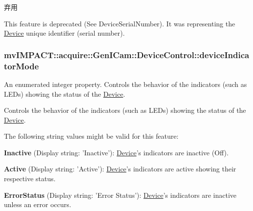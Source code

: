 \begin{DoxyRefDesc}{弃用}
\item[\hyperlink{deprecated__deprecated000037}{弃用}]This feature is deprecated (See Device\+Serial\+Number). It was representing the \hyperlink{classmv_i_m_p_a_c_t_1_1acquire_1_1_device}{Device} unique identifier (serial number). \end{DoxyRefDesc}
\hypertarget{classmv_i_m_p_a_c_t_1_1acquire_1_1_gen_i_cam_1_1_device_control_a62fc0ade07d7b47422b41314eba5d064}{
\subsubsection[{device\+Indicator\+Mode}]{ mv\+I\+M\+P\+A\+C\+T\+::acquire\+::\+Gen\+I\+Cam\+::\+Device\+Control\+::device\+Indicator\+Mode}}\label{classmv_i_m_p_a_c_t_1_1acquire_1_1_gen_i_cam_1_1_device_control_a62fc0ade07d7b47422b41314eba5d064}


An enumerated integer property. Controls the behavior of the indicators (such as L\+E\+Ds) showing the status of the \hyperlink{classmv_i_m_p_a_c_t_1_1acquire_1_1_device}{Device}. 

Controls the behavior of the indicators (such as L\+E\+Ds) showing the status of the \hyperlink{classmv_i_m_p_a_c_t_1_1acquire_1_1_device}{Device}.

The following string values might be valid for this feature\+:
\begin{DoxyItemize}
\item {\bfseries Inactive} (Display string\+: 'Inactive')\+: \hyperlink{classmv_i_m_p_a_c_t_1_1acquire_1_1_device}{Device}'s indicators are inactive (Off).
\item {\bfseries Active} (Display string\+: 'Active')\+: \hyperlink{classmv_i_m_p_a_c_t_1_1acquire_1_1_device}{Device}'s indicators are active showing their respective status.
\item {\bfseries Error\+Status} (Display string\+: 'Error Status')\+: \hyperlink{classmv_i_m_p_a_c_t_1_1acquire_1_1_device}{Device}'s indicators are inactive unless an error occurs.
\end{DoxyItemize}

